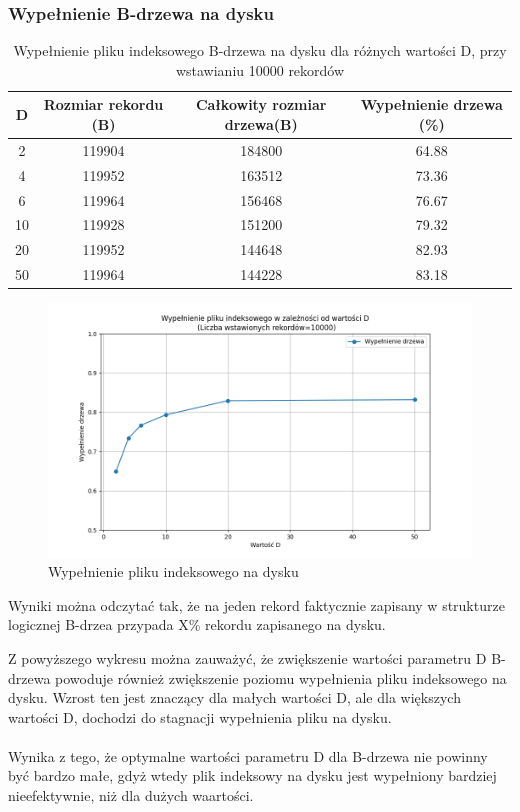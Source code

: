 \documentclass[12pt]{article}
\begin{document}
\subsubsection{Wypełnienie B-drzewa na dysku}

\begin{table}[H]
\centering
\caption{Wypełnienie pliku indeksowego B-drzewa na dysku dla różnych wartości D, przy wstawianiu 10000 rekordów}
\begin{tabular}{|c|c|c|c|}
\hline
D & Rozmiar rekordu (B) & Całkowity rozmiar drzewa(B) & Wypełnienie drzewa (\%) \\
\hline
2 & 119904 & 184800 & 64.88 \\
4 & 119952 & 163512 & 73.36 \\
6 & 119964 & 156468 & 76.67 \\
10 & 119928 & 151200 & 79.32 \\
20 & 119952 & 144648 & 82.93 \\
50 & 119964 & 144228 & 83.18 \\
\hline
\end{tabular}
\end{table}

\begin{figure}[H]
    \centering
    \includegraphics[width=\textwidth]{../Plots/tree_fill.png}
    \caption{Wypełnienie pliku indeksowego na dysku}
    \label{fig:plot2}
\end{figure}

Wyniki można odczytać tak, że na jeden rekord faktycznie zapisany w strukturze logicznej
B-drzea przypada X\% rekordu zapisanego na dysku.

Z powyższego wykresu można zauważyć, że zwiększenie wartości parametru D B-drzewa powoduje
również zwiększenie poziomu wypełnienia pliku indeksowego na dysku. Wzrost ten jest
znaczący dla małych wartości D, ale dla większych wartości D, dochodzi do stagnacji wypełnienia
pliku na dysku.
\\\\
Wynika z tego, że optymalne wartości parametru D dla B-drzewa
nie powinny być bardzo małe, gdyż wtedy plik indeksowy na dysku jest wypełniony bardziej nieefektywnie,
niż dla dużych waartości.
\end{document}
